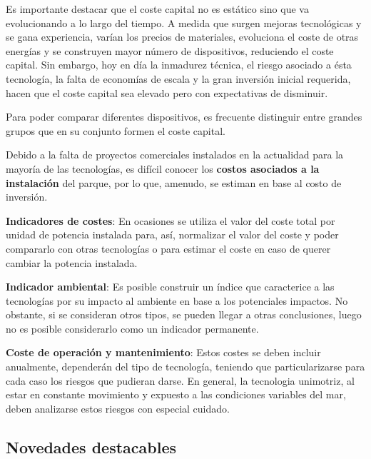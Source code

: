 Es importante destacar que el coste capital no es estático sino que va
evolucionando a lo largo del tiempo. A medida que surgen mejoras
tecnológicas y se gana experiencia, varían los precios de materiales,
evoluciona el coste de otras energías y se construyen mayor número de
dispositivos, reduciendo el coste capital. Sin embargo, hoy en día la
inmadurez técnica, el riesgo asociado a ésta tecnología, la falta de
economías de escala y la gran inversión inicial requerida, hacen que el
coste capital sea elevado pero con expectativas de disminuir.

Para poder comparar diferentes dispositivos, es frecuente distinguir
entre grandes grupos que en su conjunto formen el coste capital.

Debido a la falta de proyectos comerciales instalados en la actualidad
para la mayoría de las tecnologías, es difícil conocer los
\textbf{costos asociados a la instalación} del parque, por lo que,
amenudo, se estiman en base al costo de inversión.

\textbf{Indicadores de costes}: En ocasiones se utiliza el valor del
coste total por unidad de potencia instalada para, así, normalizar el
valor del coste y poder compararlo con otras tecnologías o para estimar
el coste en caso de querer cambiar la potencia instalada.

\textbf{Indicador ambiental}: Es posible construir un índice que
caracterice a las tecnologías por su impacto al ambiente en base a los
potenciales impactos. No obstante, si se consideran otros tipos, se
pueden llegar a otras conclusiones, luego no es posible considerarlo
como un indicador permanente.

\textbf{Coste de operación y mantenimiento}: Estos costes se deben
incluir anualmente, dependerán del tipo de tecnología, teniendo que
particularizarse para cada caso los riesgos que pudieran darse. En
general, la tecnologia unimotriz, al estar en constante movimiento y
expuesto a las condiciones variables del mar, deben analizarse estos
riesgos con especial cuidado.

\subsection{Novedades destacables}\label{header-n241}

